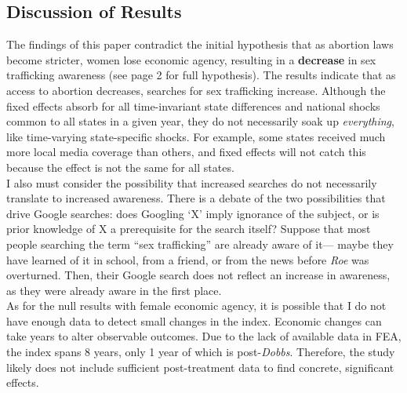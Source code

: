 \documentclass[10pt]{article}
\begin{document}
\subsection{Discussion of Results}
The findings of this paper contradict the initial hypothesis that as abortion laws become stricter, women lose economic agency, resulting in a \textbf{decrease} in sex trafficking awareness (see page 2 for full hypothesis). The results indicate that as access to abortion decreases, searches for sex trafficking increase. Although the fixed effects absorb for all time-invariant state differences and national shocks common to all states in a given year, they do not necessarily soak up \textit{everything}, like time-varying state-specific shocks. For example, some states received much more local media coverage than others, and fixed effects will not catch this because the effect is not the same for all states. \\
\indent I also must consider the possibility that increased searches do not necessarily translate to increased awareness. There is a debate of the two possibilities that drive Google searches: does Googling `X' imply ignorance of the subject, or is prior knowledge of X a prerequisite for the search itself? Suppose that most people searching the term ``sex trafficking'' are already aware of it— maybe they have learned of it in school, from a friend, or from the news before \textit{Roe} was overturned. Then, their Google search does not reflect an increase in awareness, as they were already aware in the first place. \\
\indent As for the null results with female economic agency, it is possible that I do not have enough data to detect small changes in the index. 
Economic changes can take years to alter observable outcomes. Due to the lack of available data in FEA, the index spans 8 years, only 1 year of which is post-\textit{Dobbs}. Therefore, the study likely does not include sufficient post-treatment data to find concrete, significant effects.  
\end{document}
